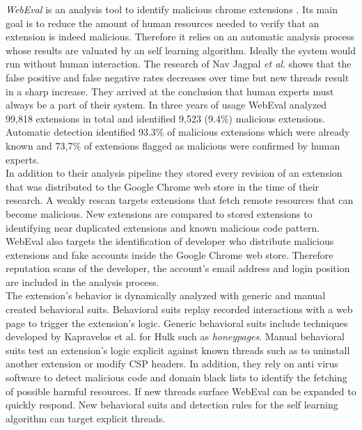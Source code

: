 		\textit{WebEval} is an analysis tool to identify malicious chrome extensions \cite{190984}. Its main goal is to reduce the amount of human resources needed to verify that an extension is indeed malicious. Therefore it relies on an automatic analysis process whose results are valuated by an self learning algorithm. Ideally the system would run without human interaction. The research of Nav Jagpal \textit{et al}. shows that the false positive and false negative rates decreases over time but new threads result in a sharp increase. They arrived at the conclusion that human experts must always be a part of their system. In three years of usage WebEval analyzed 99,818 extensions in total and identified 9,523 (9.4\%) malicious extensions. Automatic detection identified 93.3\% of malicious extensions which were already known and 73,7\% of extensions flagged as malicious were confirmed by human experts. \\
		In addition to their analysis pipeline they stored every revision of an extension that was distributed to the Google Chrome web store in the time of their research. A weakly rescan targets extensions that fetch remote resources that can become malicious. New extensions are compared to stored extensions to identifying near duplicated extensions and known malicious code pattern. WebEval also targets the identification of developer who distribute malicious extensions and fake accounts inside the Google Chrome web store. Therefore reputation scans of the developer, the account's email address and login position are included in the analysis process.  \\
		The extension's behavior is dynamically analyzed with generic and manual created behavioral suits. Behavioral suits replay recorded interactions with a web page to trigger the extension's logic. Generic behavioral suits include techniques developed by Kapravelos	et al. for Hulk \cite{184485} such as \textit{honeypages}. Manual behavioral suits test an extension's logic explicit against known threads such as to uninstall another extension or modify CSP headers. In addition, they rely on anti virus software to detect malicious code and domain black lists to identify the fetching of possible harmful resources. If new threads surface WebEval can be expanded to quickly respond. New behavioral suits and detection rules for the self learning algorithm can target explicit threads. \\
	
